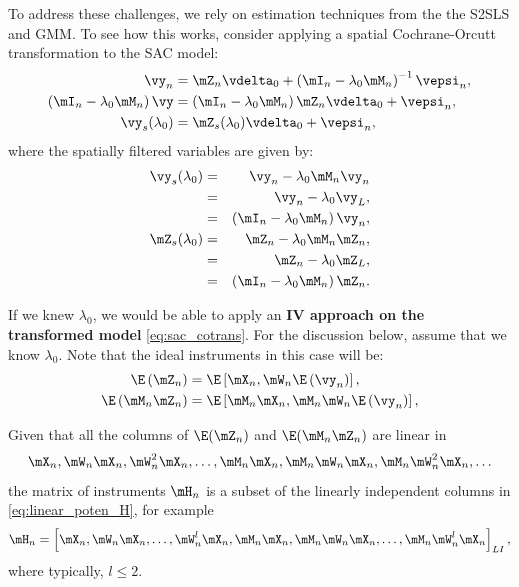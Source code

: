 \documentclass[english,12pt]{book}\usepackage[]{graphicx}\usepackage[]{xcolor}
\begin{document}
To address these challenges, we rely on estimation techniques from the the S2SLS and GMM. To see how this works, consider applying a spatial Cochrane-Orcutt transformation to the SAC model: 
\begin{equation}\label{eq:sac_cotrans}
	\begin{aligned}
	\vy_n & = \mZ_n\vdelta_0 + \left(\mI_n - \lambda_0\mM_n\right)^{-1}\vepsi_n, \\
	\left(\mI_n - \lambda_0 \mM_n\right)\vy & = \left(\mI_n - \lambda_0 \mM_n\right) \mZ_n\vdelta_0 + \vepsi_n, \\
	\vy_s(\lambda_0) & = \mZ_s(\lambda_0)\vdelta_0 + \vepsi_n, 
	\end{aligned}
\end{equation}
%
where the spatially filtered variables are given by:
\begin{eqnarray*}
\vy_s(\lambda_0) & = & \vy_n - \lambda_0 \mM_n\vy_n \\
      & = & \vy_n - \lambda_0 \vy_L, \\
      & = & \left(\mI_n - \lambda_0 \mM_n\right)\vy_n, \\
\mZ_s(\lambda_0) & = & \mZ_n - \lambda_0 \mM_n \mZ_n, \\
      & = & \mZ_n - \lambda_0 \mZ_L, \\
      & = & \left(\mI_n - \lambda_0 \mM_n\right) \mZ_n. \\
\end{eqnarray*}

If we knew $\lambda_0$, we would be able to apply an \textbf{IV approach on the transformed model} \eqref{eq:sac_cotrans}. For the discussion below, assume that we know $\lambda_0$. Note that the ideal instruments in this case will be:
\begin{equation*}
  \begin{aligned}
    \E\left(\mZ_n\right)    & = \E\left[\mX_n, \mW_n\E\left(\vy_n\right)\right], \\
    \E\left(\mM_n\mZ_n\right) & = \E\left[\mM_n\mX_n, \mM_n\mW_n\E\left(\vy_n\right)\right],
  \end{aligned}
\end{equation*}

Given that all the columns of $\E(\mZ_n)$ and $\E(\mM_n\mZ_n)$ are linear in
\begin{equation}\label{eq:linear_poten_H}
  \mX_n, \mW_n\mX_n, \mW^2_n\mX_n, \ldots, \mM_n\mX_n, \mM_n\mW_n\mX_n, \mM_n\mW^2_n\mX_n, \ldots
\end{equation}
%
the matrix of instruments $\mH_n$ is a subset of the linearly independent columns in \eqref{eq:linear_poten_H}, for example
\begin{equation*}
  \mH_n = \left[\mX_n, \mW_n\mX_n, \ldots, \mW^l_n\mX_n, \mM_n\mX_n, \mM_n\mW_n\mX_n, \ldots,\mM_n\mW^l_n\mX_n\right]_{LI},
\end{equation*}
%
where typically, $l\leq 2$. 
\end{document}
